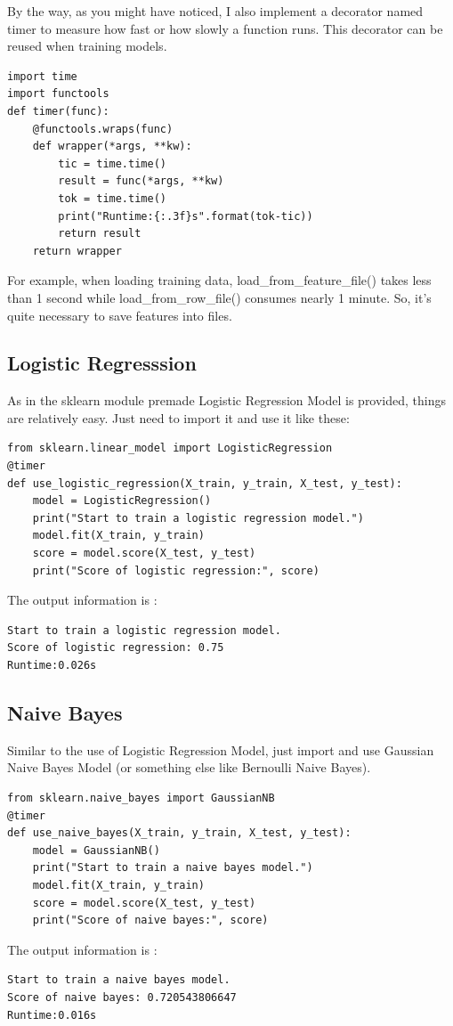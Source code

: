 \documentclass[a4paper]{article}
\begin{document}
By the way, as you might have noticed, I also implement a decorator named timer to measure how fast or how slowly a function runs. This decorator can be reused when training models.
\begin{verbatim}
import time
import functools
def timer(func):
    @functools.wraps(func)
    def wrapper(*args, **kw):
        tic = time.time()
        result = func(*args, **kw)
        tok = time.time()
        print("Runtime:{:.3f}s".format(tok-tic))
        return result
    return wrapper
\end{verbatim}
For example, when loading training data, load\_from\_feature\_file() takes less than 1 second while load\_from\_row\_file() consumes nearly 1 minute. So, it's quite necessary to save features into files.
        \subsection{Logistic Regresssion}
As in the sklearn module premade Logistic Regression Model is provided, things are relatively easy. Just need to import it and use it like these:
\begin{verbatim}
from sklearn.linear_model import LogisticRegression
@timer
def use_logistic_regression(X_train, y_train, X_test, y_test):
    model = LogisticRegression()
    print("Start to train a logistic regression model.")
    model.fit(X_train, y_train)
    score = model.score(X_test, y_test)
    print("Score of logistic regression:", score)
\end{verbatim}
The output information is :
\begin{verbatim}
Start to train a logistic regression model.
Score of logistic regression: 0.75
Runtime:0.026s
\end{verbatim}
        \subsection{Naive Bayes}
Similar to the use of Logistic Regression Model, just import and use Gaussian Naive Bayes Model (or something else like Bernoulli Naive Bayes).
\begin{verbatim}
from sklearn.naive_bayes import GaussianNB
@timer
def use_naive_bayes(X_train, y_train, X_test, y_test):
    model = GaussianNB()
    print("Start to train a naive bayes model.")
    model.fit(X_train, y_train)
    score = model.score(X_test, y_test)
    print("Score of naive bayes:", score)
\end{verbatim}
The output information is :
\begin{verbatim}
Start to train a naive bayes model.
Score of naive bayes: 0.720543806647
Runtime:0.016s
\end{verbatim}
\end{document}
